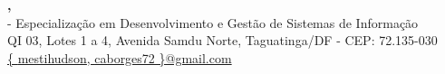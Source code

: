 \begin{center}
  \begin{singlespace}
  \Large{
    \titulo\\
    \subtitulo\\
  }
  \vspace*{.5cm}
    \normalsize{
      \textbf{
        \autor,
        \orientador\\
      }
    }
  \vspace*{.5cm}
  \small{
    \instituicao -
    Especialização em Desenvolvimento e Gestão de Sistemas de Informação\\
    QI 03, Lotes 1 a 4, Avenida Samdu Norte, Taguatinga/DF - CEP: 72.135-030\\
  }
  \vspace*{.5cm}
  {
    \ttfamily
    \footnotesize{
      \color{blue}
      \underline{
        \{
          \href{mailto:mestihudson@gmail.com}{mestihudson},
          \href{mailto:caborges72@gmail.com}{caborges72}
        \}@gmail.com
      }
    }
  }
  \end{singlespace}
\end{center}
